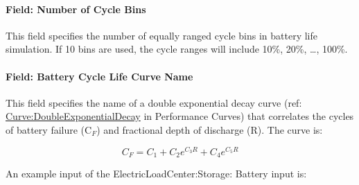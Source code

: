 \paragraph{Field: Number of Cycle Bins}\label{field-number-of-cycle-bins}

This field specifies the number of equally ranged cycle bins in battery life simulation. If 10 bins are used, the cycle ranges will include 10\%, 20\%, \ldots{}, 100\%.

\paragraph{Field: Battery Cycle Life Curve Name}\label{field-battery-cycle-life-curve-name}

This field specifies the name of a double exponential decay curve (ref: \hyperref[curvedoubleexponentialdecay]{Curve:DoubleExponentialDecay} in Performance Curves) that correlates the cycles of battery failure (C\(_{F}\)) and fractional depth of discharge (R). The curve is:

\begin{equation}
{C_F} = {C_1} + {C_2}{e^{{C_3}R}} + {C_4}{e^{{C_5}R}}
\end{equation}

An example input of the ElectricLoadCenter:Storage: Battery input is:

